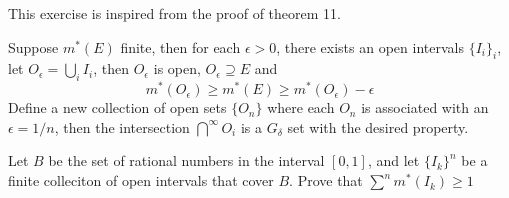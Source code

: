 \begin{solution}
    This exercise is inspired from the proof of theorem 11.

    Suppose $m^*(E)$ finite, then for each $\epsilon > 0$, there exists an open intervals $\{I_i\}_i$, let $O_\epsilon=\bigcup_i I_i$, then $O_\epsilon$ is open, $O_\epsilon \supseteq E$ and
    \begin{equation*}
        m^*(O_\epsilon) \geq m^*(E) \geq m^*(O_\epsilon) - \epsilon
    \end{equation*}
    Define a new collection of open sets $\{O_n\}$ where each $O_n$ is associated with an $\epsilon = 1/n$, then the intersection $\bigcap^\infty O_i$ is a $G_\delta$ set with the desired property.
\end{solution}

\begin{exercise}{8}
    Let $B$ be the set of rational numbers in the interval $[0, 1]$, and let $\{I_k\}^n$ be a finite colleciton of open intervals that cover $B$. Prove that $\sum^n m^*(I_k) \geq 1$
\end{exercise}